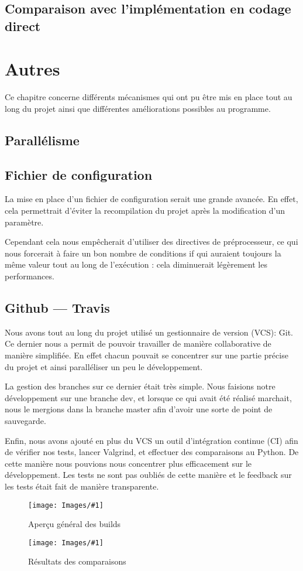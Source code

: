 \documentclass[hideweeklyreports]{polytech/polytech}
\newcommand{\img}[3]{%
	\begin{figure}[H]
		\centering
   		\texttt{[image: Images/\#1]}
  	 	\caption{#2}
	\end{figure}
}
\begin{document}
		
		\section{Comparaison avec l'implémentation en codage direct} %
	
	\chapter{Autres}
		Ce chapitre concerne différents mécanismes qui ont pu être mis en place tout au long du projet ainsi que différentes améliorations possibles au programme.
		
		\section{Parallélisme} %
		
		\section{Fichier de configuration}
			La mise en place d'un fichier de configuration serait une grande avancée. En effet, cela permettrait d'éviter la recompilation du projet après la modification d'un paramètre.
			
			Cependant cela nous empêcherait d'utiliser des directives de préprocesseur, ce qui nous forcerait à faire un bon nombre de conditions if qui auraient toujours la même valeur tout au long de l'exécution : cela diminuerait légèrement les performances.
		
		\section{Github — Travis}
			Nous avons tout au long du projet utilisé un gestionnaire de version (VCS): Git. Ce dernier nous a permit de pouvoir travailler de manière collaborative de manière simplifiée. En effet chacun pouvait se concentrer sur une partie précise du projet et ainsi paralléliser un peu le développement.
			
			La gestion des branches sur ce dernier était très simple. Nous faisions notre développement sur une branche dev, et lorsque ce qui avait été réalisé marchait, nous le mergions dans la branche master afin d'avoir une sorte de point de sauvegarde.
			
			Enfin, nous avons ajouté en plus du VCS un outil d'intégration continue (CI) afin de vérifier nos tests, lancer Valgrind, et effectuer des comparaisons au Python. De cette manière nous pouvions nous concentrer plus efficacement sur le développement. Les tests ne sont pas oubliés de cette manière et le feedback sur les tests était fait de manière transparente.
			\img{TravisAll.png}{Aperçu général des builds}{0.5}
			\img{TravisCompare.png}{Résultats des comparaisons}{0.575}
			
\end{document}
